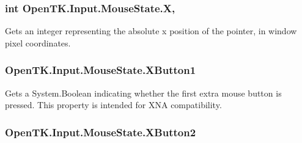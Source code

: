 \hypertarget{struct_open_t_k_1_1_input_1_1_mouse_state_a6982bc2d2ba1de945958142d3e6cc660}{
\subsubsection[{X}]{\setlength{\rightskip}{0pt plus 5cm}int Open\-T\-K.\-Input.\-Mouse\-State.\-X\hspace{0.3cm}{\ttfamily [get]}, {\ttfamily [set]}}}\label{struct_open_t_k_1_1_input_1_1_mouse_state_a6982bc2d2ba1de945958142d3e6cc660}


Gets an integer representing the absolute x position of the pointer, in window pixel coordinates. 

\hypertarget{struct_open_t_k_1_1_input_1_1_mouse_state_a693612a1acde7d368593396db3f38d37}{
\subsubsection[{X\-Button1}]{ Open\-T\-K.\-Input.\-Mouse\-State.\-X\-Button1\hspace{0.3cm}{\ttfamily [get]}}}\label{struct_open_t_k_1_1_input_1_1_mouse_state_a693612a1acde7d368593396db3f38d37}


Gets a System.\-Boolean indicating whether the first extra mouse button is pressed. This property is intended for X\-N\-A compatibility. 

\hypertarget{struct_open_t_k_1_1_input_1_1_mouse_state_a8e94d54eba550aa3ecd4836b99ba1060}{
\subsubsection[{X\-Button2}]{ Open\-T\-K.\-Input.\-Mouse\-State.\-X\-Button2\hspace{0.3cm}{\ttfamily [get]}}}\label{struct_open_t_k_1_1_input_1_1_mouse_state_a8e94d54eba550aa3ecd4836b99ba1060}


